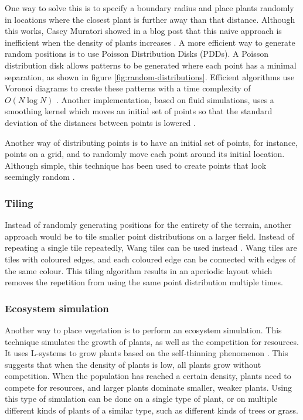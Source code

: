 \documentclass{article}
\begin{document}
One way to solve this is to specify a boundary radius and place plants randomly in locations where the closest plant is further away than that distance. Although this works, Casey Muratori showed in a blog post that this naive approach is inefficient when the density of plants increases \cite{muratori_color_2014}. A more efficient way to generate random positions is to use Poisson Distribution Disks (PDDs). A Poisson distribution disk allows patterns to be generated where each point has a minimal separation, as shown in figure \ref{fig:random-distributions}. Efficient algorithms use Voronoi diagrams to create these patterns with a time complexity of $O(N \log{} N)$ \cite{jones_efficient_2006}. Another implementation, based on fluid simulations, uses a smoothing kernel which moves an initial set of points so that the standard deviation of the distances between points is lowered \cite{jiang_blue_2015}.

Another way of distributing points is to have an initial set of points, for instance, points on a grid, and to randomly move each point around its initial location. Although simple, this technique has been used to create points that look seemingly random \cite{hammes_modeling_2001} \cite{van_muijden_gpu-based_2017}.

\subsubsection{Tiling}
Instead of randomly generating positions for the entirety of the terrain, another approach would be to tile smaller point distributions on a larger field. Instead of repeating a single tile repeatedly, Wang tiles can be used instead \cite{cohen_wang_2003}. Wang tiles are tiles with coloured edges, and each coloured edge can be connected with edges of the same colour. This tiling algorithm results in an aperiodic layout which removes the repetition from using the same point distribution multiple times.

\subsubsection{Ecosystem simulation} \label{sec:background/ecosystemsim}
Another way to place vegetation is to perform an ecosystem simulation. This technique simulates the growth of plants, as well as the competition for resources. It uses L-systems to grow plants based on the self-thinning phenomenon \cite{deussen_realistic_1998} \cite{lane_generating_2002}. This suggests that when the density of plants is low, all plants grow without competition. When the population has reached a certain density, plants need to compete for resources, and larger plants dominate smaller, weaker plants. Using this type of simulation can be done on a single type of plant, or on multiple different kinds of plants of a similar type, such as different kinds of trees or grass.
\end{document}

